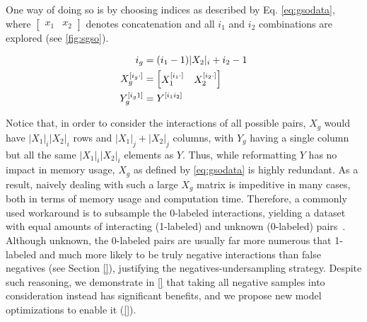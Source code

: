 One way of
doing so is by choosing indices as described by Eq. \ref{eq:gsodata}, where
$\begin{bmatrix} x_1 & x_2\end{bmatrix}$ denotes concatenation and all $i_1$ and
$i_2$ combinations are explored (see \autoref{fig:sgso}).

%
\begin{equation}
    \begin{split}
    i_g &= (i_1-1)|X_2|_i+i_2-1\\
    X_g ^{[i_g\cdot]} &= \begin{bmatrix} X_1 ^{[i_1\cdot]} & X_2^{[i_2\cdot]}\end{bmatrix}\\
    Y_g ^{[i_g1]} &= Y^{[i_1i_2]}
    \end{split}
    \label{eq:gsodata}
\end{equation}

Notice that, in order to consider the interactions of all possible pairs, $X_g$ would have $|X_1|_i|X_2|_i$ rows and $|X_1|_j+|X_2|_j$ columns, with $Y_g$ having a single column but all the same $|X_1|_i|X_2|_i$ elements as $Y$. Thus, while reformatting $Y$ has no impact in memory usage, $X_g$ as defined by \autoref{eq:gsodata} is highly redundant.
As a result, naively dealing with such a large $X_g$ matrix is impeditive in many cases, both in terms of memory usage and computation time. Therefore, a commonly used workaround is to subsample the 0-labeled interactions, yielding a dataset with equal amounts of interacting (1-labeled) and unknown (0-labeled) pairs~\cite{}.
Although unknown, the 0-labeled pairs are usually far more numerous that 1-labeled and much more likely to be truly negative interactions than false negatives (see Section \ref{}), justifying the negatives-undersampling strategy. Despite such reasoning, we demonstrate in \autoref{} that taking all negative samples into consideration instead has significant benefits, and we propose new model optimizations to enable it (\autoref{}).


